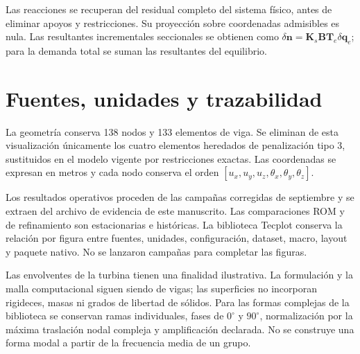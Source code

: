Las reacciones se recuperan del residual completo del sistema físico, antes de eliminar apoyos y restricciones. Su proyección sobre coordenadas admisibles es nula. Las resultantes incrementales seccionales se obtienen como $\delta\bm n=\bm K_s\bm B\bm T_e\delta\bm q_e$; para la demanda total se suman las resultantes del equilibrio.


\section{Fuentes, unidades y trazabilidad}\label{ap:datos}
La geometría conserva 138 nodos y 133 elementos de viga. Se eliminan de esta visualización únicamente los cuatro elementos heredados de penalización tipo 3, sustituidos en el modelo vigente por restricciones exactas. Las coordenadas se expresan en metros y cada nodo conserva el orden $[u_x,u_y,u_z,\theta_x,\theta_y,\theta_z]$.

Los resultados operativos proceden de las campañas corregidas de septiembre y se extraen del archivo de evidencia de este manuscrito. Las comparaciones ROM y de refinamiento son estacionarias e históricas. La biblioteca Tecplot conserva la relación por figura entre fuentes, unidades, configuración, dataset, macro, layout y paquete nativo. No se lanzaron campañas para completar las figuras.

Las envolventes de la turbina tienen una finalidad ilustrativa. La formulación y la malla computacional siguen siendo de vigas; las superficies no incorporan rigideces, masas ni grados de libertad de sólidos. Para las formas complejas de la biblioteca se conservan ramas individuales, fases de $0^\circ$ y $90^\circ$, normalización por la máxima traslación nodal compleja y amplificación declarada. No se construye una forma modal a partir de la frecuencia media de un grupo.
